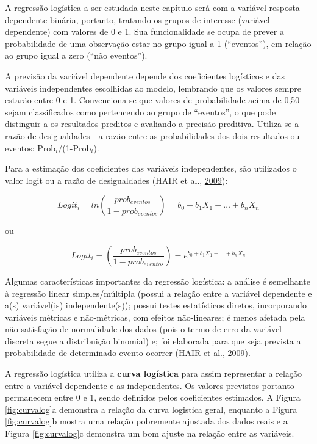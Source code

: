 \documentclass[12pt,brazil,oneside]{book}
\begin{document}
A regressão logística a ser estudada neste capítulo será com a variável
resposta dependente binária, portanto, tratando os grupos de interesse
(variável dependente) com valores de 0 e 1. Sua funcionalidade se ocupa
de prever a probabilidade de uma observação estar no grupo igual a 1
(``eventos''), em relação ao grupo igual a zero (``não eventos'').

A previsão da variável dependente depende dos coeficientes logísticos e
das variáveis independentes escolhidas ao modelo, lembrando que os
valores sempre estarão entre 0 e 1. Convenciona-se que valores de
probabilidade acima de 0,50 sejam classificados como pertencendo ao
grupo de ``eventos'', o que pode distinguir a os resultados preditos e
avaliando a precisão preditiva. Utiliza-se a razão de desigualdades - a
razão entre as probabilidades dos dois resultados ou eventos:
Prob\(_{i}/\)(1-Prob\(_{i}\)).

Para a estimação dos coeficientes das variáveis independentes, são
utilizados o valor logit ou a razão de desigualdades (HAIR et al.,
\protect\hyperlink{ref-Hair2009}{2009}):

\[
Logit_i=ln\left (\frac{prob_{eventos}}{1-prob_{eventos}}  \right )=b_0+b_1X_1+\ldots+b_nX_n
\]

ou

\[
Logit_i=\left (\frac{prob_{eventos}}{1-prob_{eventos}}  \right )=e^{b_0+b_1X_1+\ldots+b_nX_n}
\]

Algumas características importantes da regressão logística: a análise é
semelhante à regressão linear simples/múltipla (possui a relação entre a
variável dependente e a(s) variável(is) independente(s)); possui testes
estatísticos diretos, incorporando variáveis métricas e não-métricas,
com efeitos não-lineares; é menos afetada pela não satisfação de
normalidade dos dados (pois o termo de erro da variável discreta segue a
distribuição binomial) e; foi elaborada para que seja prevista a
probabilidade de determinado evento ocorrer (HAIR et al.,
\protect\hyperlink{ref-Hair2009}{2009}).

A regressão logística utiliza a \textbf{curva logística} para assim
representar a relação entre a variável dependente e as independentes. Os
valores previstos portanto permanecem entre 0 e 1, sendo definidos pelos
coeficientes estimados. A Figura \ref{fig:curvalog}a demonstra a relação
da curva logistica geral, enquanto a Figura \ref{fig:curvalog}b mostra
uma relação pobremente ajustada dos dados reais e a Figura
\ref{fig:curvalog}c demonstra um bom ajuste na relação entre as
variáveis.
\end{document}
